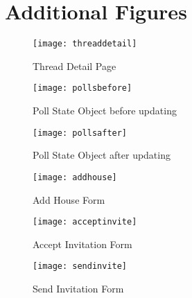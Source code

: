 \chapter{Additional Figures}
\begin{figure}[H]
    \begin{center}
    \texttt{[image: threaddetail]}
    \end{center}
    \caption{Thread Detail Page}
    \label{fig:threaddetail}
\end{figure}

\begin{figure}[H]
    \begin{center}
    \texttt{[image: pollsbefore]}
    \end{center}
    \caption{Poll State Object before updating}
    \label{fig:pollsbefore}
\end{figure}

\begin{figure}[H]
    \begin{center}
    \texttt{[image: pollsafter]}
    \end{center}
    \caption{Poll State Object after updating}
    \label{fig:pollsafter}
\end{figure}

\begin{figure}[H]
    \begin{center}
    \texttt{[image: addhouse]}
    \end{center}
    \caption{Add House Form}
    \label{fig:addhouse}
\end{figure}

\begin{figure}[H]
    \begin{center}
    \texttt{[image: acceptinvite]}
    \end{center}
    \caption{Accept Invitation Form}
    \label{fig:acceptinvite}
\end{figure}

\begin{figure}[H]
    \begin{center}
    \texttt{[image: sendinvite]}
    \end{center}
    \caption{Send Invitation Form}
    \label{fig:sendinvite}
\end{figure}



